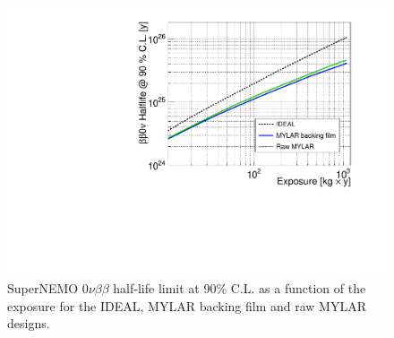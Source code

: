 \documentclass[main.tex]{subfiles}
\begin{document}



\begin{figure}[h!]
\centering
\includegraphics[scale=0.6]{pictures/Chap4/rawMylar.pdf}
\caption{SuperNEMO 0$\nu\beta\beta$ half-life limit at 90\% C.L. as a function of the exposure for the IDEAL, MYLAR backing film and raw MYLAR designs.}
\label{RawMylarDesignComparison}
\end{figure}
\end{document}
